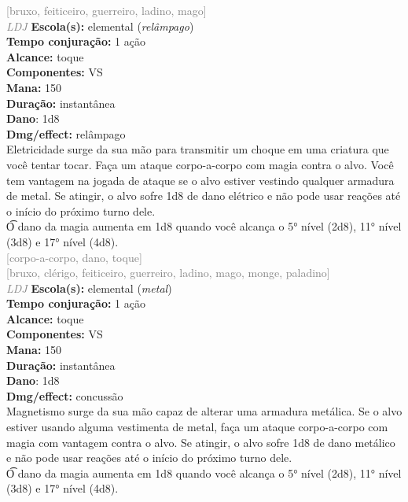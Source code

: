 \documentclass{RPG_Adventure}[2021/10/20]
\begin{document}
{\scriptsize \textcolor{gray}{[bruxo, feiticeiro, guerreiro, ladino, mago]\\}}
{\tiny \textcolor{gray}{\textit{LDJ}}}\jump{}
{\small \t \textbf{Escola(s):} elemental (\textit{relâmpago})\\\t \textbf{Tempo conjuração:} 1 ação\\\t \textbf{Alcance:} toque\\\t \textbf{Componentes:} VS\\\t \textbf{Mana:} 150\\\t \textbf{Duração:} instantânea\\\t \textbf{Dano}: 1d8\\\t \textbf{Dmg/effect:} relâmpago\\}
{\normalsize Eletricidade surge da sua mão para transmitir um choque em uma criatura que você tentar tocar. Faça um ataque corpo-a-corpo com magia contra o alvo. Você tem vantagem na jogada de ataque se o alvo estiver vestindo qualquer armadura de metal. Se atingir, o alvo sofre 1d8 de dano elétrico e não pode usar reações até o início do próximo turno dele.\\\t O dano da magia aumenta em 1d8 quando você alcança o 5° nível (2d8), 11° nível (3d8) e 17° nível (4d8).\\}
{\scriptsize \textcolor{gray}{[corpo-a-corpo, dano, toque]\\}}
{\scriptsize \textcolor{gray}{[bruxo, clérigo, feiticeiro, guerreiro, ladino, mago, monge, paladino]\\}}
{\tiny \textcolor{gray}{\textit{LDJ}}}\jump{}
{\small \t \textbf{Escola(s):} elemental (\textit{metal})\\\t \textbf{Tempo conjuração:} 1 ação\\\t \textbf{Alcance:} toque\\\t \textbf{Componentes:} VS\\\t \textbf{Mana:} 150\\\t \textbf{Duração:} instantânea\\\t \textbf{Dano}: 1d8\\\t \textbf{Dmg/effect:} concussão\\}
{\normalsize Magnetismo surge da sua mão capaz de alterar uma armadura metálica. Se o alvo estiver usando alguma vestimenta de metal, faça um ataque corpo-a-corpo com magia com vantagem contra o alvo. Se atingir, o alvo sofre 1d8 de dano metálico e não pode usar reações até o início do próximo turno dele.\\\t O dano da magia aumenta em 1d8 quando você alcança o 5° nível (2d8), 11° nível (3d8) e 17° nível (4d8).\\}
\end{document}
